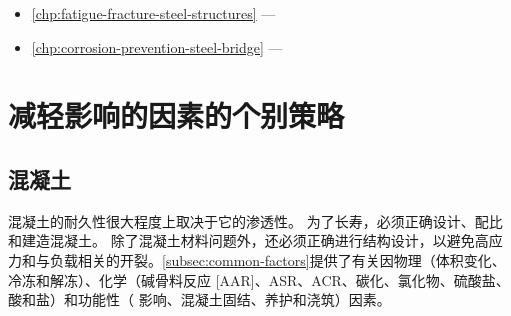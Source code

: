 \begin{itemize}
  \item \cref{chp:fatigue-fracture-steel-structures} — 
  \item \cref{chp:corrosion-prevention-steel-bridge} — 
\end{itemize}

\section{减轻影响的因素的个别策略}
\label{sec:individual-strategies}
\subsection{混凝土}
混凝土的耐久性很大程度上取决于它的渗透性。 为了长寿，必须正确设计、配比和建造混凝土。 除了混凝土材料问题外，还必须正确进行结构设计，以避免高应力和与负载相关的开裂。\cref{subsec:common-factors}提供了有关因物理（体积变化、冷冻和解冻）、化学（碱骨料反应 [AAR]、ASR、ACR、碳化、氯化物、硫酸盐、酸和盐）和功能性（ 影响、混凝土固结、养护和浇筑）因素。

